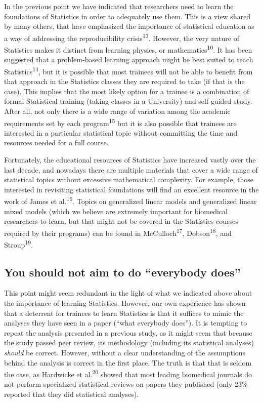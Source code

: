 \documentclass[smallextended]{svjour3}       %
\begin{document}
In the previous point we have indicated that researchers need to learn
the foundations of Statistics in order to adequately use them. This is a
view shared by many others, that have emphasized the importance of
statistical education as a way of addressing the reproducibility
crisis\textsuperscript{13}. However, the very nature of Statistics makes
it distinct from learning physics, or mathematics\textsuperscript{10}.
It has been suggested that a problem-based learning approach might be
best suited to teach Statistics\textsuperscript{14}, but it is possible
that most trainees will not be able to benefit from that approach in the
Statistics classes they are required to take (if that is the case). This
implies that the most likely option for a trainee is a combination of
formal Statistical training (taking classes in a University) and
self-guided study. After all, not only there is a wide range of
variation among the academic requirements set by each
program\textsuperscript{15} but it is also possible that trainees are
interested in a particular statistical topic without committing the time
and resources needed for a full course.

Fortunately, the educational resources of Statistics have increased
vastly over the last decade, and nowadays there are multiple materials
that cover a wide range of statistical topics without excessive
mathematical complexity. For example, those interested in revisiting
statistical foundations will find an excellent resource in the work of
James et al.\textsuperscript{16}. Topics on generalized linear models
and generalized linear mixed models (which we believe are extremely
important for biomedical researchers to learn, but that might not be
covered in the Statistics courses required by their programs) can be
found in McCulloch\textsuperscript{17}, Dobson\textsuperscript{18}, and
Stroup\textsuperscript{19}.

\hypertarget{you-should-not-aim-to-do-everybody-does}{%
\subsection{You should not aim to do ``everybody
does''}\label{you-should-not-aim-to-do-everybody-does}}

This point might seem redundant in the light of what we indicated above
about the importance of learning Statistics. However, our own experience
has shown that a deterrent for trainees to learn Statistics is that it
suffices to mimic the analyses they have seen in a paper (``what
everybody does''). It is tempting to repeat the analysis presented in a
previous study, as it might seem that because the study passed peer
review, its methodology (including its statistical analyses)
\emph{should} be correct. However, without a clear understanding of the
assumptions behind the analysis is correct in the first place. The truth
is that that is seldom the case, as Hardwicke et al.\textsuperscript{20}
showed that most leading biomedical journals do not perform specialized
statistical reviews on papers they published (only 23\% reported that
they did statistical analyses).
\end{document}

